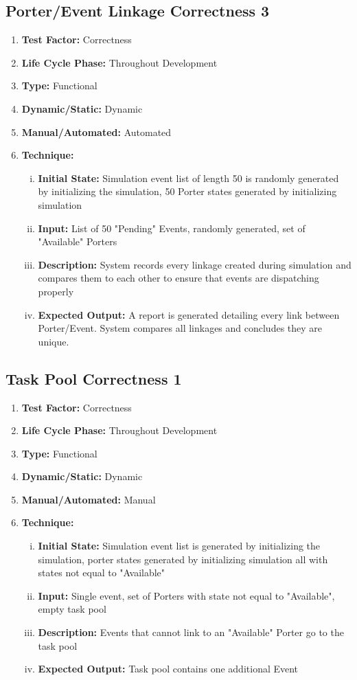 \documentclass[paper=letter, fontsize=10pt]{scrartcl}
\numberwithin{equation}{section}		%
\numberwithin{figure}{section}			%
\numberwithin{table}{section}				%
\begin{document}
\subsection{Porter/Event Linkage Correctness 3}
\begin{enumerate}[] 	
	\item \textbf{Test Factor:} Correctness 
	\item \textbf{Life Cycle Phase:} Throughout Development
	\item \textbf{Type:} Functional
	\item \textbf{Dynamic/Static:} Dynamic
	\item \textbf{Manual/Automated:} Automated
	\item \textbf{Technique:}
		\begin{enumerate}[(i)]
			\item \textbf{Initial State:} Simulation event list of length 50 is randomly generated by initializing the simulation, 50 Porter states generated by initializing simulation
			\item \textbf{Input:} List of 50 "Pending" Events, randomly generated, set of "Available" Porters
			\item \textbf{Description:} System records every linkage created during simulation and compares them to each other to ensure that events are dispatching properly
			\item \textbf{Expected Output:} A report is generated detailing every link between Porter/Event. System compares all linkages and concludes they are unique.
		\end{enumerate}
\end{enumerate}

\subsection{Task Pool Correctness 1}
\begin{enumerate}[]
	\item \textbf{Test Factor:} Correctness
	\item \textbf{Life Cycle Phase:} Throughout Development
	\item \textbf{Type:} Functional
	\item \textbf{Dynamic/Static:} Dynamic
	\item \textbf{Manual/Automated:} Manual
	\item \textbf{Technique:}
		\begin{enumerate}[(i)]
			\item \textbf{Initial State:} Simulation event list is generated by initializing the simulation, porter states generated by initializing simulation all with states not equal to "Available"
			\item \textbf{Input:} Single event, set of Porters with state not equal to "Available", empty task pool
			\item \textbf{Description:} Events that cannot link to an "Available" Porter go to the task pool
			\item \textbf{Expected Output:} Task pool contains one additional Event 
		\end{enumerate}
\end{enumerate}
\end{document}
